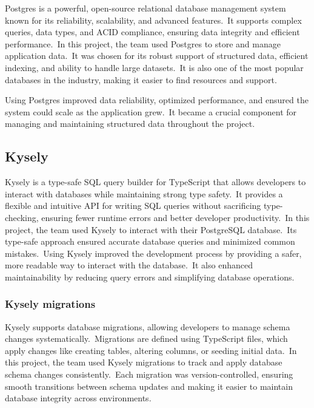 Postgres is a powerful, open-source relational database management system known for its reliability, scalability, and advanced features.\ It supports complex queries, data types, and ACID compliance, ensuring data integrity and efficient performance.\ In this project, the team used Postgres to store and manage application data.\ It was chosen for its robust support of structured data, efficient indexing, and ability to handle large datasets.\ It is also one of the most popular databases in the industry, making it easier to find resources and support.\cite[Postgres]{postgres}

Using Postgres improved data reliability, optimized performance, and ensured the system could scale as the application grew.\ It became a crucial component for managing and maintaining structured data throughout the project.

\subsection{Kysely}\label{subsec:kysely}

Kysely is a type-safe SQL query builder for TypeScript that allows developers to interact with databases while maintaining strong type safety.\ It provides a flexible and intuitive API for writing SQL queries without sacrificing type-checking, ensuring fewer runtime errors and better developer productivity.\ In this project, the team used Kysely to interact with their PostgreSQL database.\ Its type-safe approach ensured accurate database queries and minimized common mistakes.\ Using Kysely improved the development process by providing a safer, more readable way to interact with the database.\ It also enhanced maintainability by reducing query errors and simplifying database operations.\cite[Kysely]{kysely}

\subsubsection{Kysely migrations}\label{subsubsec:kysely-migrations}

Kysely supports database migrations, allowing developers to manage schema changes systematically.\ Migrations are defined using TypeScript files, which apply changes like creating tables, altering columns, or seeding initial data.\ In this project, the team used Kysely migrations to track and apply database schema changes consistently.\ Each migration was version-controlled, ensuring smooth transitions between schema updates and making it easier to maintain database integrity across environments.

